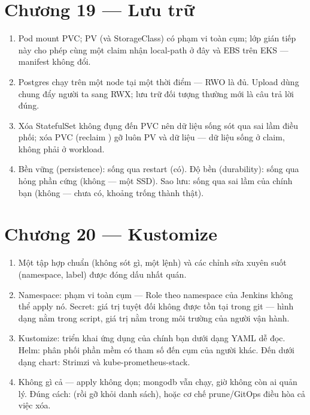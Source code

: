\section*{Chương 19 --- Lưu trữ}
\begin{enumerate}
  \item Pod mount PVC; PV (và StorageClass) có phạm vi toàn cụm; lớp
  gián tiếp này cho phép cùng một claim nhận local-path ở đây và EBS
  trên EKS --- manifest không đổi.
  \item Postgres chạy trên một node tại một thời điểm --- RWO là đủ.
  Upload dùng chung đẩy người ta sang RWX; lưu trữ đối tượng thường
  mới là câu trả lời đúng.
  \item Xóa StatefulSet không đụng đến PVC nên dữ liệu sống sót qua sai
  lầm điều phối; xóa PVC (reclaim ) gỡ luôn PV và dữ liệu
  --- dữ liệu sống ở claim, không phải ở workload.
  \item Bền vững (persistence): sống qua restart (có). Độ bền
  (durability): sống qua hỏng phần cứng (không --- một SSD). Sao lưu:
  sống qua sai lầm của chính bạn (không --- chưa có, khoảng trống
  thành thật).
\end{enumerate}

\section*{Chương 20 --- Kustomize}
\begin{enumerate}
  \item Một tập hợp chuẩn (không sót gì, một lệnh) và các chỉnh sửa
  xuyên suốt (namespace, label) được đóng dấu nhất quán.
  \item Namespace: phạm vi toàn cụm --- Role theo namespace của Jenkins
  không thể apply nó. Secret: giá trị tuyệt đối không được tồn tại
  trong git --- hình dạng nằm trong script, giá trị nằm trong môi
  trường của người vận hành.
  \item Kustomize: triển khai ứng dụng của chính bạn dưới dạng YAML dễ
  đọc. Helm: phân phối phần mềm có tham số đến cụm của người khác. Đến
  dưới dạng chart: Strimzi và kube-prometheus-stack.
  \item Không gì cả --- apply không dọn; mongodb vẫn chạy, giờ không
  còn ai quản lý. Đúng cách:  (rồi
  gỡ khỏi danh sách), hoặc cơ chế prune/GitOps điều hòa cả việc xóa.
\end{enumerate}

